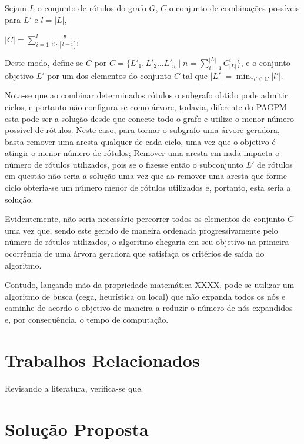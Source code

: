 \documentclass[12pt]{article}
\begin{document}
	Sejam $L$ o conjunto de rótulos do grafo $G$, $C$ o conjunto de combinações possíveis para $L'$ e $l = |L|$,

	\begin{center}
	$\displaystyle{|C| = \sum_{i = 1}^{l}{\frac {l!}{i! \cdot [l-i]!}}}$
	\end{center}

	Deste modo, define-se $C$ por $\displaystyle{C = \{L'_1, L'_2 \dots L'_n \mid n = \sum_{i = 1}^{|L|}{C_{|L|}^{i}}\}}$, e o conjunto objetivo $L'$ por um dos elementos do conjunto $C$ tal que $\displaystyle{|L'| = \min_{\forall l' \in C} |l'|}$.

	Nota-se que ao combinar determinados rótulos o subgrafo obtido pode admitir ciclos, e portanto não configura-se como árvore, todavia, diferente do PAGPM esta pode ser a solução desde que conecte todo o grafo e utilize o menor número possível de rótulos. Neste caso, para tornar o subgrafo uma árvore geradora, basta remover uma aresta qualquer de cada ciclo, uma vez que o objetivo é atingir o menor número de rótulos; Remover uma aresta em nada impacta o número de rótulos utilizados, pois se o fizesse então o subconjunto $L'$ de rótulos em questão não seria a solução uma vez que ao remover uma aresta que forme ciclo obteria-se um número menor de rótulos utilizados e, portanto, esta seria a solução.

	Evidentemente, não seria necessário percorrer todos os elementos do conjunto $C$ uma vez que, sendo este gerado de maneira ordenada progressivamente pelo número de rótulos utilizados, o algoritmo chegaria em seu objetivo na primeira ocorrência de uma árvora geradora que satisfaça os critérios de saída do algoritmo.

	Contudo, lançando mão da propriedade matemática XXXX, pode-se utilizar um algoritmo de busca (cega, heurística ou local) que não expanda todos os nós e caminhe de acordo o objetivo de maneira a reduzir o número de nós expandidos e, por consequência, o tempo de computação.

\section{Trabalhos Relacionados}\label{sec:trabalhosRelacionados}

	Revisando a literatura, verifica-se que.

\section{Solução Proposta}\label{sec:solucao}
\end{document}
